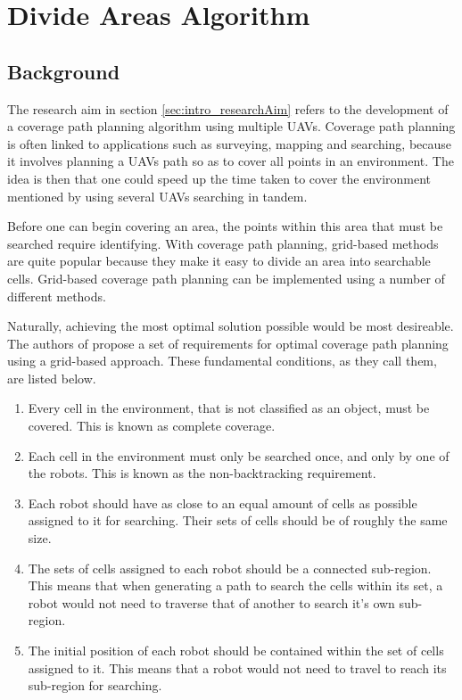 \chapter{Divide Areas Algorithm}
\label{chp:DARP}


\section{Background}
The research aim in section \ref{sec:intro_researchAim} refers to the development of a coverage path planning algorithm using multiple UAVs. Coverage path planning is often linked to applications such as surveying, mapping and searching, because it involves planning a UAVs path so as to cover all points in an environment. The idea is then that one could speed up the time taken to cover the environment mentioned by using several UAVs searching in tandem.

Before one can begin covering an area, the points within this area that must be searched require identifying. With coverage path planning, grid-based methods are quite popular because they make it easy to divide an area into searchable cells.
Grid-based coverage path planning can be implemented using a number of different methods. 

Naturally, achieving the most optimal solution possible would be most desireable. The authors of \cite{DARP2017} propose a set of requirements for optimal coverage path planning using a grid-based approach. These fundamental conditions, as they call them, are listed below.

\begin{enumerate}
	\item Every cell in the environment, that is not classified as an object, must be covered. This is known as complete coverage.
	\item Each cell in the environment must only be searched once, and only by one of the robots. This is known as the non-backtracking requirement.
	\item Each robot should have as close to an equal amount of cells as possible assigned to it for searching. Their sets of cells should be of roughly the same size.
	\item The sets of cells assigned to each robot should be a connected sub-region. This means that when generating a path to search the cells within its set, a robot would not need to traverse that of another to search it's own sub-region.
	\item The initial position of each robot should be contained within the set of cells assigned to it. This means that a robot would not need to travel to reach its sub-region for searching.
\end{enumerate}
